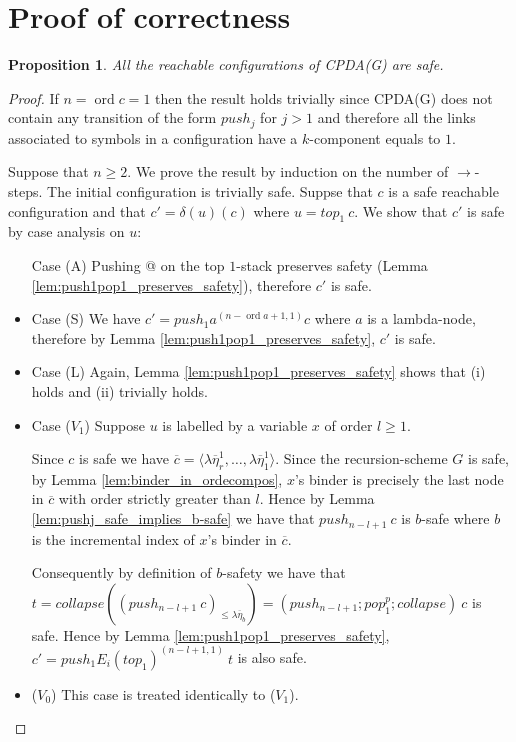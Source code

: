 \documentclass{article}
\newcommand{\ord}{\mathop{\mathrm{ord}}}
\newcommand{\prefixof}{\leqslant}
\newtheorem{proposition}{Proposition}[section]
\theoremstyle{remark}
\theoremstyle{definition}
\newcommand\orddec\overline
\begin{document}
\section{Proof of correctness}

\begin{proposition}
All the reachable configurations of CPDA(G) are safe.
\end{proposition}
\begin{proof}
If $n =\ord{c} =1$ then the result holds trivially since CPDA(G) does not contain
any transition of the form $push_j$ for $j>1$ and therefore all the links associated to symbols in a configuration have a $k$-component equals to $1$.

Suppose that $n\geq 2$. We prove the result by induction on the number of
$\rightarrow$-steps. The initial configuration is trivially safe.
Suppse that $c$ is a safe reachable configuration and that
$c'=\delta(u)(c)$ where $u = top_1\ c$.
We show that $c'$ is safe by case analysis on $u$:
\begin{itemize}
\item[Case (A)] Pushing @ on the top $1$-stack preserves safety (Lemma
\ref{lem:push1pop1_preserves_safety}), therefore $c'$ is safe.

\item Case (S)
We have $c' = push_1 a^{(n-\ord{a}+1,1)} c$ where $a$ is a
lambda-node, therefore by Lemma \ref{lem:push1pop1_preserves_safety},
$c'$ is safe.

\item Case (L) Again, Lemma \ref{lem:push1pop1_preserves_safety}
shows that (i) holds and (ii) trivially holds.

\item Case ($V_1$) Suppose $u$ is labelled by a variable $x$ of order $l\geq 1$.

Since $c$ is safe we have $\orddec{c} = \langle \lambda
\overline{\eta}_r^1 , \ldots, \lambda \overline{\eta}_1^1
\rangle$.
Since the recursion-scheme $G$ is safe, by Lemma \ref{lem:binder_in_ordecompos}, $x$'s binder is precisely the
last node in $\orddec{c}$ with order strictly greater than $l$.
Hence by Lemma \ref{lem:pushj_safe_implies_b-safe}
we have that $push_{n-l+1}\ c$ is $b$-safe where $b$ is the
incremental index of $x$'s binder in $\orddec{c}$.

Consequently by definition of $b$-safety we have that
$t = collapse \left( (push_{n-l+1}~ c)_{\prefixof \lambda
\overline{\eta}_{b}} \right) = (push_{n-l+1};pop_1^p;collapse)
~c$ is safe. Hence by
Lemma \ref{lem:push1pop1_preserves_safety}, $c' = push_1 E_i(top_1)^{(n-l+1,1)}\ t$ is also safe.

\item ($V_0$) This case is treated identically to ($V_1$).
\end{itemize}
\end{proof}
\end{document}
